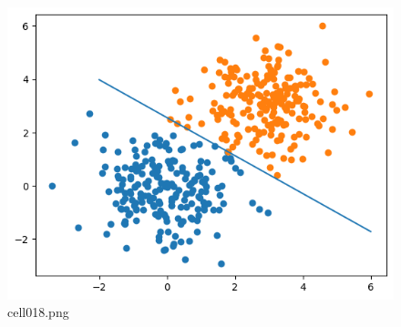 \begin{figure}[ht]
	\centering
	\includegraphics[scale=0.8, max width=\linewidth]{./fig/local-learning-rule/logistic-regression-perceptron/cell018.png}
	\caption{cell018.png}
	\label{cell018.png}
\end{figure}